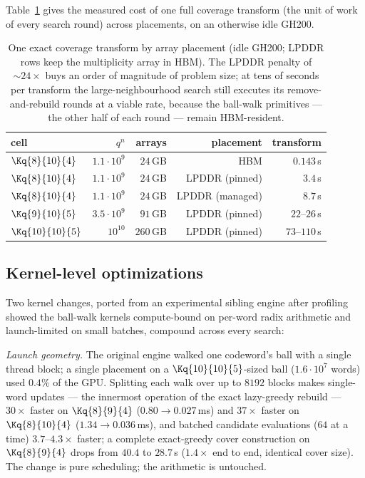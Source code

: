 Table~\ref{tab:hc} gives the measured cost of one full coverage transform
(the unit of work of every search round) across placements, on an
otherwise idle GH200.
\begin{table}[t]
\centering
\begin{tabular}{lrrrr}
\toprule
cell & $q^n$ & arrays & placement & transform \\
\midrule
$\Kq{8}{10}{4}$ & $1.1\cdot 10^9$ & $24$\,GB & HBM & $0.143$\,s \\
$\Kq{8}{10}{4}$ & $1.1\cdot 10^9$ & $24$\,GB & LPDDR (pinned) & $3.4$\,s \\
$\Kq{8}{10}{4}$ & $1.1\cdot 10^9$ & $24$\,GB & LPDDR (managed) & $8.7$\,s \\
$\Kq{9}{10}{5}$ & $3.5\cdot 10^9$ & $91$\,GB & LPDDR (pinned) & $22$--$26$\,s \\
$\Kq{10}{10}{5}$ & $10^{10}$ & $260$\,GB & LPDDR (pinned) & $73$--$110$\,s \\
\bottomrule
\end{tabular}
\caption{One exact coverage transform by array placement (idle GH200;
LPDDR rows keep the multiplicity array in HBM). The LPDDR penalty of
$\sim\!24\times$ buys an order of magnitude of problem size; at tens of
seconds per transform the large-neighbourhood search still executes its
remove-and-rebuild rounds at a viable rate, because the ball-walk
primitives --- the other half of each round --- remain HBM-resident.}
\label{tab:hc}
\end{table}

\subsection{Kernel-level optimizations}\label{sec:gpu:kernels}

Two kernel changes, ported from an experimental sibling engine after
profiling showed the ball-walk kernels compute-bound on per-word
radix arithmetic and launch-limited on small batches, compound across
every search:

\emph{Launch geometry.} The original engine walked one codeword's ball
with a single thread block; a single placement on a $\Kq{10}{10}{5}$-sized
ball ($1.6\cdot 10^7$ words) used $0.4\%$ of the GPU. Splitting each walk
over up to $8192$ blocks makes single-word updates --- the innermost
operation of the exact lazy-greedy rebuild --- $30\times$ faster on
$\Kq{8}{9}{4}$ ($0.80\to 0.027$\,ms) and $37\times$ faster on
$\Kq{8}{10}{4}$ ($1.34\to 0.036$\,ms), and batched candidate evaluations
($64$ at a time) $3.7$--$4.3\times$ faster; a complete exact-greedy cover
construction on $\Kq{8}{9}{4}$ drops from $40.4$ to $28.7$\,s
($1.4\times$ end to end, identical cover size). The change is pure
scheduling; the arithmetic is untouched.

